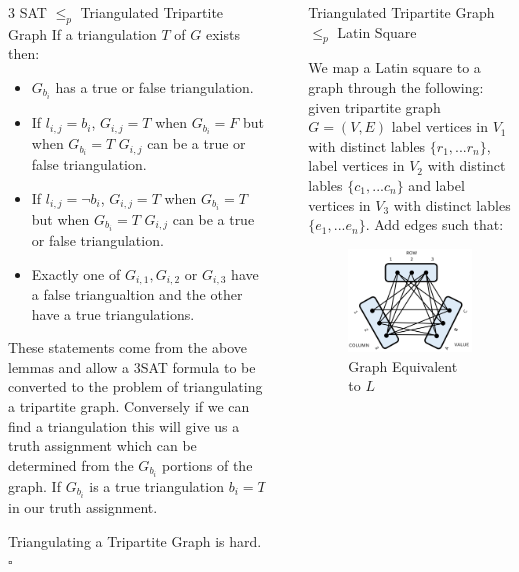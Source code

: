 \documentclass[final]{beamer}
\newlength{\sepwidth}
\newlength{\colwidth}
\newcounter{col}
\newcommand{\separatorcolumn}{\begin{column}{\sepwidth}\end{column}}
\begin{document}
\begin{frame}[t]
\begin{columns}[t]
\begin{column}{\colwidth}
\begin{block}{3 SAT $\leq_p$ Triangulated Tripartite Graph \cite{doi:10.1137/0210054}}
If a triangulation $T$ of $G$ exists then: 
\begin{itemize}
\item $G_{b_i}$ has a true or false triangulation. 
\item If $l_{i,j}=b_i$, $G_{i,j}= T$ when $G_{b_i}=F$ but when $G_{b_i}=T$ $G_{i,j}$ can be a true or false triangulation. 
\item If $l_{i,j}=\neg b_i$, $G_{i,j}= T$ when $G_{b_i}=T$ but when $G_{b_i}=T$ $G_{i,j}$ can be a true or false triangulation. 
\item Exactly one of $G_{i,1}, G_{i,2}$ or $G_{i,3}$ have a false triangualtion and the other have a true triangulations.
\end{itemize}

These statements come from the above lemmas and allow a 3SAT formula to be converted to the problem of triangulating a tripartite graph. Conversely if we can find a triangulation this will give us a truth assignment which can be determined from the $G_{b_i}$ portions of the graph. If $G_{b_i}$ is a true triangulation $b_i = T$ in our truth assignment. 

Triangulating a Tripartite Graph is hard. $\square$
  \end{block}

\end{column}

\separatorcolumn
\begin{column}{\colwidth}
 
  \begin{block}{Triangulated Tripartite Graph $\leq_p$ Latin Square \cite{COLBOURN198425}}

We map a Latin square to a graph through the following: given tripartite graph $G=(V,E)$ label vertices in $V_1$ with distinct lables $\{r_1,...r_n\}$, label vertices in $V_2$ with distinct lables $\{c_1,...c_n\}$ and label vertices in $V_3$ with distinct lables $\{e_1,...e_n\}$. Add edges such that:

\begin{figure}
		\vspace{-100pt}
		\includegraphics[width=50mm]{ttg.png}
		\caption{Graph Equivalent to $L$}
		\vspace{-30pt}
\end{figure}


\end{block}
\end{column}
\end{columns}
\end{frame}
\end{document}
